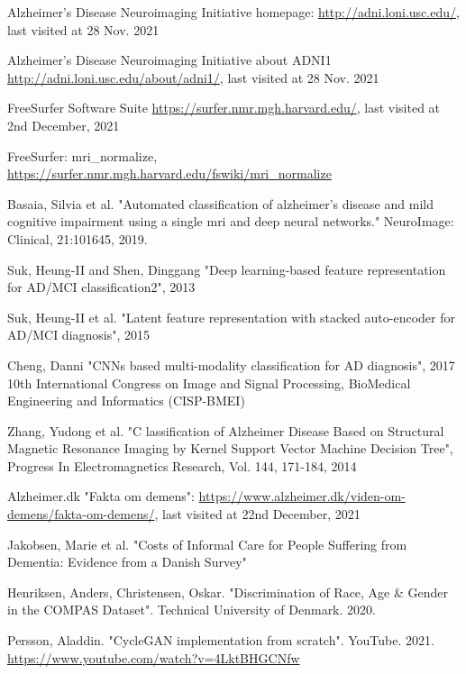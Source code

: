 \documentclass[12pt, fleqn, titlepage]{article}
\begin{document}
\begin{thebibliography}{9}
		  Alzheimer’s
		Disease Neuroimaging Initiative homepage: \url{http://adni.loni.usc.edu/}, last visited at 
		28 Nov. 2021
		
		 Alzheimer’s
		Disease Neuroimaging Initiative about ADNI1 \url{http://adni.loni.usc.edu/about/adni1/}, last visited at 28 Nov. 2021
		
		 FreeSurfer Software Suite \url{https://surfer.nmr.mgh.harvard.edu/}, last visited at 2nd December, 2021
		
		 FreeSurfer: mri\_normalize, \url{https://surfer.nmr.mgh.harvard.edu/fswiki/mri_normalize}
		
		 Basaia, Silvia et al. "Automated classification of alzheimer’s disease and mild cognitive impairment using a
		single mri and deep neural networks." NeuroImage: Clinical, 21:101645, 2019.
		
		 Suk, Heung-II and Shen, Dinggang
		 "Deep learning-based feature representation for AD/MCI classification2", 2013
		 
		  Suk, Heung-II et al. "Latent feature representation with stacked auto-encoder for AD/MCI diagnosis", 2015
		
		 Cheng, Danni "CNNs based multi-modality classification for AD diagnosis", 2017 10th International Congress on Image and Signal Processing, BioMedical Engineering and Informatics (CISP-BMEI) 
		
		 Zhang, Yudong et al. "C	lassification of Alzheimer Disease Based on Structural Magnetic
		Resonance Imaging by Kernel Support Vector Machine Decision Tree", Progress In Electromagnetics Research, Vol. 144, 171-184, 2014
		
		 Alzheimer.dk "Fakta om demens": \url{https://www.alzheimer.dk/viden-om-demens/fakta-om-demens/}, last visited at 22nd December, 2021
		
		 Jakobsen, Marie et al. "Costs of Informal Care for People Suffering from Dementia: Evidence from a Danish Survey"
		
		 Henriksen, Anders, Christensen, Oskar. "Discrimination of Race, Age \& Gender in the COMPAS Dataset". Technical University of Denmark. 2020.
		
		 Persson, Aladdin. "CycleGAN implementation from scratch". YouTube. 2021.  \url{https://www.youtube.com/watch?v=4LktBHGCNfw}
	

\end{thebibliography}
\end{document}
